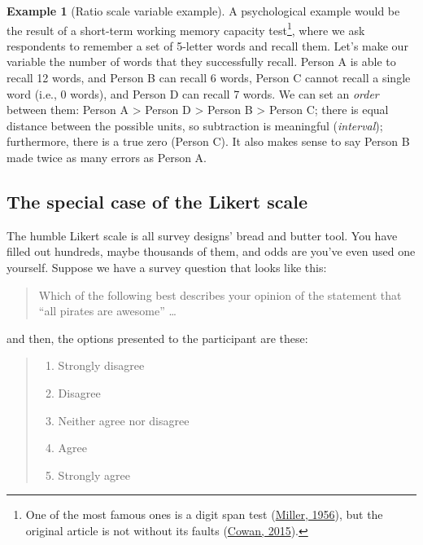 \documentclass[
  11pt,
]{book}
\providecommand{\tightlist}{%
  \setlength{\itemsep}{0pt}\setlength{\parskip}{0pt}}
\theoremstyle{definition}
\theoremstyle{definition}
\newtheorem{example}{Example}[chapter]
\theoremstyle{definition}
\theoremstyle{definition}
\theoremstyle{remark}
\begin{document}
\begin{example}[Ratio scale variable example]
\protect\hypertarget{exm:exratio}{}\label{exm:exratio}A psychological example would be the result of a short-term working memory capacity test\footnote{One of the most famous ones is a digit span test (\protect\hyperlink{ref-millerMagicalNumberSeven1956}{Miller, 1956}), but the original article is not without its faults (\protect\hyperlink{ref-cowanGeorgeMillerMagical2015}{Cowan, 2015}).}, where we ask respondents to remember a set of 5-letter words and recall them. Let's make our variable the number of words that they successfully recall. Person A is able to recall 12 words, and Person B can recall 6 words, Person C cannot recall a single word (i.e., 0 words), and Person D can recall 7 words. We can set an \emph{order} between them: Person A \textgreater{} Person D \textgreater{} Person B \textgreater{} Person C; there is equal distance between the possible units, so subtraction is meaningful (\emph{interval}); furthermore, there is a true zero (Person C). It also makes sense to say Person B made twice as many errors as Person A.
\end{example}

\hypertarget{likertscale}{%
\subsection{The special case of the Likert scale}\label{likertscale}}

The humble Likert scale is all survey designs' bread and butter tool. You have filled out hundreds, maybe thousands of them, and odds are you've even used one yourself. Suppose we have a survey question that looks like this:

\begin{quote}
Which of the following best describes your opinion of the statement that ``all pirates are awesome'' \ldots{}
\end{quote}

\nopagebreak[4]

and then, the options presented to the participant are these:

\begin{keepTogether}

\begin{quote}
\begin{enumerate}
\def\labelenumi{(\arabic{enumi})}
\tightlist
\item
  Strongly disagree
\item
  Disagree
\item
  Neither agree nor disagree
\item
  Agree
\item
  Strongly agree
\end{enumerate}
\end{quote}

\end{keepTogether}
\end{document}
